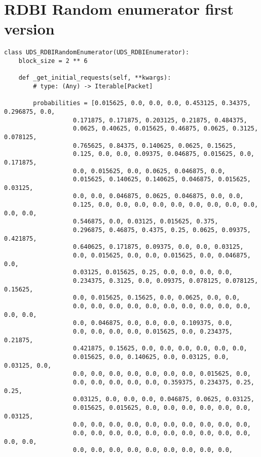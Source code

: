 \appendix

\section{RDBI Random enumerator first version}
\label{app:random-not-compact}

\begin{verbatim}
class UDS_RDBIRandomEnumerator(UDS_RDBIEnumerator):
    block_size = 2 ** 6

    def _get_initial_requests(self, **kwargs):
        # type: (Any) -> Iterable[Packet]

        probabilities = [0.015625, 0.0, 0.0, 0.0, 0.453125, 0.34375, 0.296875, 0.0,
                   0.171875, 0.171875, 0.203125, 0.21875, 0.484375,
                   0.0625, 0.40625, 0.015625, 0.46875, 0.0625, 0.3125, 0.078125,
                   0.765625, 0.84375, 0.140625, 0.0625, 0.15625,
                   0.125, 0.0, 0.0, 0.09375, 0.046875, 0.015625, 0.0, 0.171875,
                   0.0, 0.015625, 0.0, 0.0625, 0.046875, 0.0,
                   0.015625, 0.140625, 0.140625, 0.046875, 0.015625, 0.03125,
                   0.0, 0.0, 0.046875, 0.0625, 0.046875, 0.0, 0.0,
                   0.125, 0.0, 0.0, 0.0, 0.0, 0.0, 0.0, 0.0, 0.0, 0.0, 0.0, 0.0,
                   0.546875, 0.0, 0.03125, 0.015625, 0.375,
                   0.296875, 0.46875, 0.4375, 0.25, 0.0625, 0.09375, 0.421875,
                   0.640625, 0.171875, 0.09375, 0.0, 0.0, 0.03125,
                   0.0, 0.015625, 0.0, 0.0, 0.015625, 0.0, 0.046875, 0.0,
                   0.03125, 0.015625, 0.25, 0.0, 0.0, 0.0, 0.0,
                   0.234375, 0.3125, 0.0, 0.09375, 0.078125, 0.078125, 0.15625,
                   0.0, 0.015625, 0.15625, 0.0, 0.0625, 0.0, 0.0,
                   0.0, 0.0, 0.0, 0.0, 0.0, 0.0, 0.0, 0.0, 0.0, 0.0, 0.0, 0.0,
                   0.0, 0.046875, 0.0, 0.0, 0.0, 0.109375, 0.0,
                   0.0, 0.0, 0.0, 0.0, 0.015625, 0.0, 0.234375, 0.21875,
                   0.421875, 0.15625, 0.0, 0.0, 0.0, 0.0, 0.0, 0.0,
                   0.015625, 0.0, 0.140625, 0.0, 0.03125, 0.0, 0.03125, 0.0,
                   0.0, 0.0, 0.0, 0.0, 0.0, 0.0, 0.0, 0.015625, 0.0,
                   0.0, 0.0, 0.0, 0.0, 0.0, 0.359375, 0.234375, 0.25, 0.25,
                   0.03125, 0.0, 0.0, 0.0, 0.046875, 0.0625, 0.03125,
                   0.015625, 0.015625, 0.0, 0.0, 0.0, 0.0, 0.0, 0.0, 0.03125,
                   0.0, 0.0, 0.0, 0.0, 0.0, 0.0, 0.0, 0.0, 0.0, 0.0,
                   0.0, 0.0, 0.0, 0.0, 0.0, 0.0, 0.0, 0.0, 0.0, 0.0, 0.0, 0.0,
                   0.0, 0.0, 0.0, 0.0, 0.0, 0.0, 0.0, 0.0, 0.0,

\end{verbatim}
